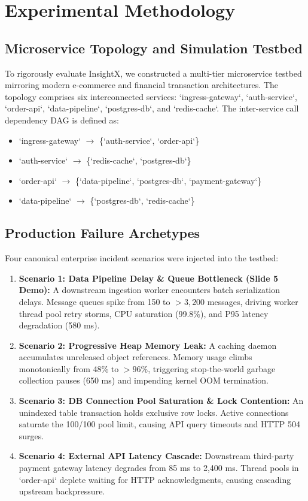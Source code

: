 \documentclass[conference]{IEEEtran}
\begin{document}
\section{Experimental Methodology}

\subsection{Microservice Topology and Simulation Testbed}
To rigorously evaluate InsightX, we constructed a multi-tier microservice testbed mirroring modern e-commerce and financial transaction architectures. The topology comprises six interconnected services: `ingress-gateway`, `auth-service`, `order-api`, `data-pipeline`, `postgres-db`, and `redis-cache`. The inter-service call dependency DAG is defined as:
\begin{itemize}
    \item `ingress-gateway` $\longrightarrow$ \{`auth-service`, `order-api`\}
    \item `auth-service` $\longrightarrow$ \{`redis-cache`, `postgres-db`\}
    \item `order-api` $\longrightarrow$ \{`data-pipeline`, `postgres-db`, `payment-gateway`\}
    \item `data-pipeline` $\longrightarrow$ \{`postgres-db`, `redis-cache`\}
\end{itemize}

\subsection{Production Failure Archetypes}
Four canonical enterprise incident scenarios were injected into the testbed:
\begin{enumerate}
    \item \textbf{Scenario 1: Data Pipeline Delay \& Queue Bottleneck (Slide 5 Demo):} A downstream ingestion worker encounters batch serialization delays. Message queues spike from 150 to $>3,200$ messages, driving worker thread pool retry storms, CPU saturation (99.8\%), and P95 latency degradation (580 ms).
    \item \textbf{Scenario 2: Progressive Heap Memory Leak:} A caching daemon accumulates unreleased object references. Memory usage climbs monotonically from 48\% to $>96\%$, triggering stop-the-world garbage collection pauses (650 ms) and impending kernel OOM termination.
    \item \textbf{Scenario 3: DB Connection Pool Saturation \& Lock Contention:} An unindexed table transaction holds exclusive row locks. Active connections saturate the 100/100 pool limit, causing API query timeouts and HTTP 504 surges.
    \item \textbf{Scenario 4: External API Latency Cascade:} Downstream third-party payment gateway latency degrades from 85 ms to 2,400 ms. Thread pools in `order-api` deplete waiting for HTTP acknowledgments, causing cascading upstream backpressure.
\end{enumerate}
\end{document}
